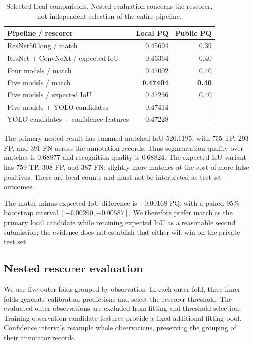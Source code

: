 \documentclass[sigconf,nonacm]{acmart}
\begin{document}
\begin{table}[h]
\caption{Selected local comparisons. Nested evaluation concerns the
rescorer, not independent selection of the entire pipeline.}
\centering\small
\begin{tabular}{lrr}
\toprule
Pipeline / rescorer & Local PQ & Public PQ\\
\midrule
ResNet50 long / match & 0.45694 & 0.39\\
ResNet + ConvNeXt / expected IoU & 0.46364 & 0.40\\
Four models / match & 0.47002 & 0.40\\
Five models / match & \textbf{0.47404} & \textbf{0.40}\\
Five models / expected IoU & 0.47236 & 0.40\\
Five models + YOLO candidates & 0.47414 & --\\
YOLO candidates + confidence features & 0.47228 & --\\
\bottomrule
\end{tabular}
\end{table}

The primary nested result has summed matched IoU 520.0195, with 755 TP,
293 FP, and 391 FN across the annotation records. Thus segmentation
quality over matches is 0.68877 and recognition quality is 0.68824.
The expected-IoU variant has 759 TP, 308 FP, and 387 FN: slightly more
matches at the cost of more false positives. These are local counts and
must not be interpreted as test-set outcomes.

The match-minus-expected-IoU difference is $+0.00168$ PQ, with a paired
95\% bootstrap interval $[-0.00260,+0.00587]$. We therefore prefer match
as the primary local candidate while retaining expected IoU as a reasonable
second submission; the evidence does not establish that either will win
on the private test set.

\subsection{Nested rescorer evaluation}
We use five outer folds grouped by observation. In each outer fold, three
inner folds generate calibration predictions and select the rescorer
threshold. The evaluated outer observations are excluded from fitting and
threshold selection. Training-observation candidate features provide a
fixed additional fitting pool. Confidence intervals resample whole
observations, preserving the grouping of their annotator records.
\end{document}
